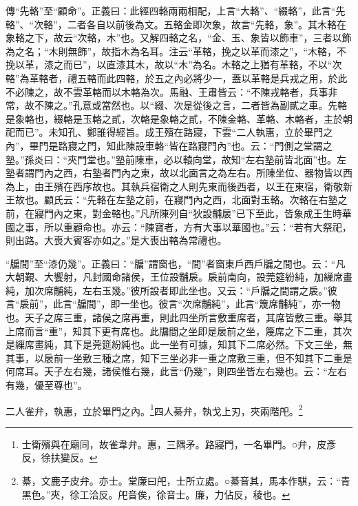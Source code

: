 {\noindent\zhuan{}\fzbyks 傳“先輅”至“顧命”。正義曰：此經四輅兩兩相配，上言“大輅”、“綴輅”，此言“先輅”、“次輅”，二者各自以前後為文。五輅金即次象，故言“先輅，象”。其木輅在象輅之下，故云“次輅，木”也。又解四輅之名，“金、玉、象皆以飾車”，三者以飾為之名；“木則無飾”，故指木為名耳。注云“革輅，挽之以革而漆之”，“木輅，不挽以革，漆之而已”，以直漆其木，故以“木”為名。木輅之上猶有革輅，不以“次輅”為革輅者，禮五輅而此四輅，於五之內必將少一，蓋以革輅是兵戎之用，於此不必陳之，故不雲革輅而以木輅為次。馬融、王肅皆云：“不陳戎輅者，兵事非常，故不陳之。”孔意或當然也。以“綴、次是從後之言，二者皆為副貳之車。先輅是象輅也，綴輅是玉輅之貳，次輅是象輅之貳，不陳金輅、革輅、木輅者，主於朝祀而已”。未知孔、鄭誰得經旨。成王殯在路寢，下雲“二人執惠，立於畢門之內”，畢門是路寢之門，知此陳設車輅“皆在路寢門內”也。云：“門側之堂謂之塾。”孫炎曰：“夾門堂也。”塾前陳車，必以轅向堂，故知“左右塾前皆北面”也。左塾者謂門內之西，右塾者門內之東，故以北面言之為左右。所陳坐位、器物皆以西為上，由王殯在西序故也。其執兵宿衛之人則先東而後西者，以王在東宿，衛敬新王故也。顧氏云：“先輅在左塾之前，在寢門內之西，北面對玉輅。次輅在右塾之前，在寢門內之東，對金輅也。”凡所陳列自“狄設黼扆”已下至此，皆象成王生時華國之事，所以重顧命也。亦云：“陳寶者，方有大事以華國也。”云：“若有大祭祀，則出路。大喪大賓客亦如之。”是大喪出輅為常禮也。 \par}

{\noindent\shu{}\fzkt “牖間”至“漆仍幾”。正義曰：“牖”謂窗也，“間”者窗東戶西戶牖之間也。云：“凡大朝覲、大饗射，凡封國命諸侯，王位設黼扆。扆前南向，設莞筵紛純，加繅席畫純，加次席黼純，左右玉幾。”彼所設者即此坐也。又云：“戶牖之間謂之扆。”彼言“扆前”，此言“牖間”，即一坐也。彼言“次席黼純”，此言“篾席黼純”，亦一物也。天子之席三重，諸侯之席再重，則此四坐所言敷重席者，其席皆敷三重。舉其上席而言“重”，知其下更有席也。此牖間之坐即是扆前之坐，篾席之下二重，其次是繅席畫純，其下是莞筵紛純也。此一坐有可據，知其下二席必然。下文三坐，無其事，以扆前一坐敷三種之席，知下三坐必非一重之席敷三重，但不知其下二重是何席耳。天子左右幾，諸侯惟右幾，此言“仍幾”，則四坐皆左右幾也。云：“左右有幾，優至尊也”。 \par}

二人雀弁，執惠，立於畢門之內。\footnote{士衛殯與在廟同，故雀韋弁。惠，三隅矛。路寢門，一名畢門。○弁，皮彥反，徐扶變反。}四人綦弁，執戈上刃，夾兩階戺。\footnote{綦，文鹿子皮弁。亦士。堂廉曰戺，士所立處。○綦音其，馬本作騏，云：“青黑色。”夾，徐工洽反。戺音俟，徐音士。廉，力佔反，稜也。}


